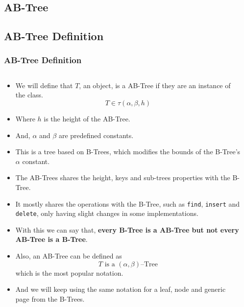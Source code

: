 \begin{frame}
    \section{AB-Tree}
    \subsection{AB-Tree Definition}
    \frametitle{AB-Tree Definition}
    \begin{columns}
        \begin{column}{\textlecolumn}
            \begin{block}{}
                \begin{itemize}
                    \item We will define that \(T\), an object, is a AB-Tree if they are an instance of the class.
                        \[
                            T \in \tau\left(\alpha, \beta, h\right)
                        \]
                    \item Where \(h\) is the height of the AB-Tree.
                    \item And, \(\alpha\) and \(\beta\) are predefined constants.
                    \item This is a tree based on B-Trees, which modifies the bounds of the B-Tree's \(\alpha\) constant.
                    \item The AB-Trees shares the height, keys and sub-trees properties with the B-Tree.
                    \item It mostly shares the operations with the B-Tree, such as 
                        \lstinline|find|, \lstinline|insert| and \lstinline|delete|, only having slight changes in some implementations.
                    \item With this we can say that, \textbf{every B-Tree is a AB-Tree but not every AB-Tree is a B-Tree}.
                    \item Also, an AB-Tree can be defined as
                        \[
                            T \text{ is a } \left(\alpha, \beta\right)\text{--Tree}
                        \] which is the most popular notation.
                    \item And we will keep using the same notation for a leaf, node and generic page from the B-Trees.
                \end{itemize}
            \end{block}
        \end{column}
        \begin{column}{\textricolumn}
        \end{column}
    \end{columns}
\end{frame}
